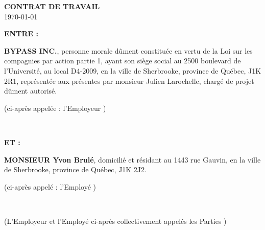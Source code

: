 \documentclass{article}
\begin{document}
	
	
%    

    \onehalfspacing
    
    {\centering \Large {\bfseries \uppercase{Contrat de Travail}} \\ \today \par} \vspace{2\baselineskip}
    
    \begin{minipage}[t]{0.45\textwidth}
    	\bfseries\uppercase{Entre :}
    \end{minipage}%
    \hfill{}%
    \begin{minipage}[t]{0.45\textwidth}
    	{\bfseries\uppercase{ByPass Inc.}}, personne morale dûment constituée en vertu de la Loi sur les compagnies par action partie 1, ayant son siège social au 2500 boulevard de l'Université, au local D4-2009, en la ville de Sherbrooke, province de Québec, J1K 2R1, représentée aux présentes par monsieur {Julien Larochelle, chargé de projet} dûment autorisé. \\ 

    	{\raggedleft (ci-après appelée : \og l'Employeur \fg{}) \par}    	
    \end{minipage} \\ \vspace{\baselineskip}
    
    \begin{minipage}[t]{0.45\textwidth}
    	\bfseries\uppercase{Et :}
    \end{minipage}%
    \hfill{}%
    \begin{minipage}[t]{0.45\textwidth}
    	{\bfseries\uppercase{Monsieur} Yvon Brulé}, domicilié et résidant au 1443 rue Gauvin, en la ville de Sherbrooke, province de Québec, J1K 2J2. \\
    	
    	{\raggedleft (ci-après appelé : \og l'Employé \fg{}) \par}
    \end{minipage} \\ \vspace{\baselineskip}
    
    \begin{minipage}[t]{0.45\textwidth}
    \end{minipage}%
    \hfill%
    \begin{minipage}[t]{0.45\textwidth}
    	(L'Employeur et l'Employé ci-après collectivement appelés \og les Parties \fg{})
    \end{minipage} \\ \vspace{\baselineskip}
    
\end{document}
